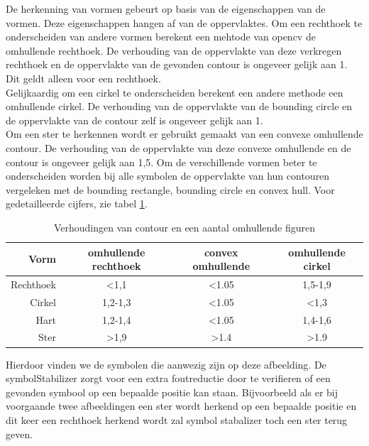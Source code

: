 \documentclass[eind]{penoverslag}
\begin{document}
De herkenning van vormen gebeurt op basis van de eigenschappen van de vormen. Deze eigenschappen hangen af van de oppervlaktes.
Om een rechthoek te onderscheiden van andere vormen berekent een mehtode van opencv de omhullende rechthoek. De verhouding van de oppervlakte van deze verkregen rechthoek en de oppervlakte van de gevonden contour is ongeveer gelijk aan 1. Dit geldt alleen voor een rechthoek. \\
Gelijkaardig om een cirkel te onderscheiden berekent een andere methode een omhullende cirkel. De verhouding van de oppervlakte van de bounding circle en de oppervlakte van de contour zelf is ongeveer gelijk aan 1.\\
Om een ster te herkennen wordt er gebruikt gemaakt van een convexe omhullende contour. De verhouding van de oppervlakte van deze convexe omhullende en de contour is ongeveer gelijk aan 1,5. Om de verschillende vormen beter te onderscheiden worden bij alle symbolen de oppervlakte van hun contouren vergeleken met de bounding rectangle, bounding circle en convex hull. Voor gedetailleerde cijfers, zie tabel \ref{recognitionTable}.\\


\begin{table}[h]
\begin{center}
\begin{tabular}{r|c|c|c}

Vorm		&	omhullende rechthoek	&	convex omhullende	&	omhullende cirkel\\
\hline
						
Rechthoek	&	\textless1,1		&	\textless1.05		&	1,5-1,9\\
Cirkel		&	1,2-1,3			&	\textless1.05		&	\textless1,3\\
Hart		&	1,2-1,4			&	\textless1.05		&	1,4-1,6\\
Ster		&	\textgreater1,9		&	\textgreater1.4		&	\textgreater1.9\\

\end{tabular}
\caption{Verhoudingen van contour en een aantal omhullende figuren}
\label{recognitionTable}

\end{center}
\end{table}


Hierdoor vinden we de symbolen die aanwezig zijn op deze afbeelding. De symbolStabilizer zorgt voor een extra foutreductie door te verifieren of een gevonden symbool op een bepaalde positie kan staan. Bijvoorbeeld als er bij voorgaande twee afbeeldingen een ster wordt herkend op een bepaalde positie en dit keer een rechthoek herkend wordt zal symbol stabalizer toch een ster terug geven. \\ 
\end{document}
